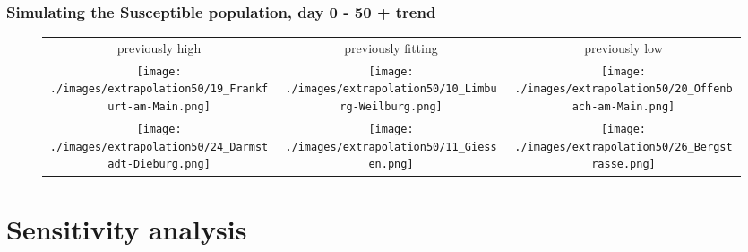 \documentclass{beamer}
\begin{document}
\begin{frame}
	\frametitle{Simulating the Susceptible population, day 0 - 50 + trend}
	\begin{center}
		\begin{figure}
			\begin{adjustwidth}{-0.8cm}{}
			\begin{tabular}{ccc}
				previously high & previously fitting & previously low \\
				\texttt{[image: ./images/extrapolation50/19\_Frankfurt-am-Main.png]}
					& \texttt{[image: ./images/extrapolation50/10\_Limburg-Weilburg.png]}
					& \texttt{[image: ./images/extrapolation50/20\_Offenbach-am-Main.png]} \\
				\texttt{[image: ./images/extrapolation50/24\_Darmstadt-Dieburg.png]}
					& \texttt{[image: ./images/extrapolation50/11\_Giessen.png]}
					& \texttt{[image: ./images/extrapolation50/26\_Bergstrasse.png]}
			\end{tabular}
			\end{adjustwidth}
		\end{figure}
	\end{center}
\end{frame}



\section{Sensitivity analysis}
\end{document}
